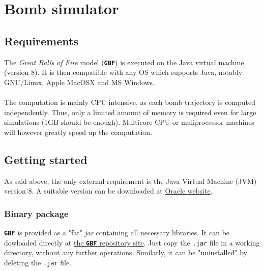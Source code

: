 \documentclass[10pt,a4paper]{article}
\begin{document}
  


\section{Bomb simulator}

\subsection{Requirements}
\label{sec-1}

The \textit{Great Balls of Fire} model (\textbf{\texttt{\textsf{\color{namecolor}GBF}}}) is executed on the Java virtual machine (version 8). It is then
compatible with any OS which supports Java, notably GNU/Linux, Apple
MacOSX and MS Windows.

\paragraph{}	The computation is mainly CPU intensive, as each bomb trajectory is
computed independently. Thus, only a
limited amount of memory is required even for large simulations (1GB
should be enough). Multicore CPU or muliprocessor machines will
however greatly speed up the computation.

\subsection{Getting started}
\label{sec-2}

As said above, the only external requirement is the Java Virtual Machine (JVM) version 8.
A suitable version can be downloaded at \href{http://www.oracle.com/technetwork/java/javase/downloads/index.html}{Oracle website}.

\subsubsection{Binary package}
\label{sec-2-1}

\textbf{\texttt{\textsf{\color{namecolor}GBF}}} is provided as a "fat"
\textit{jar} containing all necessary libraries. It can be dowloaded
directly at
\href{https://github.com/unigeSPC/gbf/tree/master/simulator/release/}{the
  \textbf{\texttt{\textsf{\color{namecolor}GBF}}} repository site}. Just
copy the \texttt{.jar} file in a working directory, without any
further operations. Similarly, it can be "uninstalled" by deleting the
\texttt{.jar} file.
\end{document}
